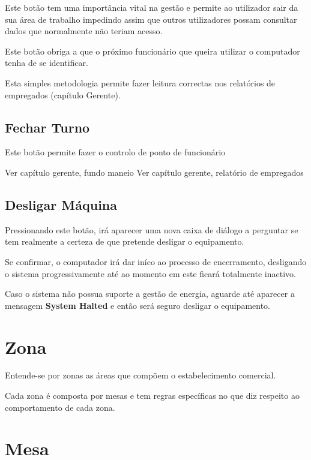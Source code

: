 \documentclass[a4paper,11pt,openany]{memoir}
\begin{document}
Este botão tem uma importância vital na gestão e permite ao utilizador sair da sua área de trabalho
impedindo assim que outros utilizadores possam consultar dados que normalmente não teriam acesso.

Este botão obriga a que o próximo funcionário que queira utilizar o computador tenha de se identificar.

Esta simples metodologia permite fazer leitura correctas nos relatórios de empregados (capítulo Gerente).

\section{Fechar Turno}

Este botão permite fazer o controlo de ponto de funcionário

Ver capítulo gerente, fundo maneio
Ver capítulo gerente, relatório de empregados


\section{Desligar Máquina}

Pressionando este botão, irá aparecer uma nova caixa de diálogo a perguntar se tem realmente a certeza
de que pretende desligar o equipamento.

Se confirmar, o computador irá dar iníco ao processo de encerramento, desligando o sistema progressivamente
até ao momento em este ficará totalmente inactivo.

\begin{boxedminipage}{\textwidth}
        Caso o sistema não possua suporte a gestão de energia,
	aguarde até aparecer a mensagem \textbf{System Halted} e então será seguro desligar o equipamento.
\end{boxedminipage}



\chapter{Zona}

Entende-se por zonas as áreas que compõem o estabelecimento comercial.

Cada zona é composta por mesas e tem regras específicas no que diz respeito ao comportamento de cada zona.




\chapter{Mesa}
\end{document}
